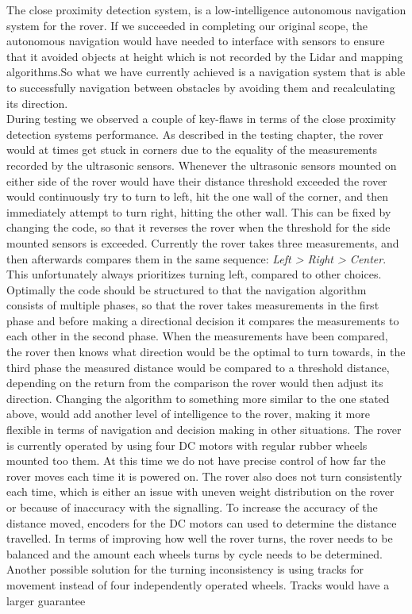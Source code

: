 The close proximity detection system, is a low-intelligence autonomous navigation system for the rover. If we succeeded in completing our original scope, the autonomous navigation would have needed to interface with sensors to ensure that it avoided objects at height which is not recorded by the Lidar and mapping algorithms.So what we have currently achieved is a navigation system that is able to successfully navigation between obstacles by avoiding them and recalculating its direction.\\

During testing we observed a couple of key-flaws in terms of the close proximity detection systems performance.
As described in the testing chapter, the rover would at times get stuck in corners due to the equality of the measurements recorded by the ultrasonic sensors. Whenever the ultrasonic sensors mounted on either side of the rover would have their distance threshold exceeded the rover would continuously try to turn to left, hit the one wall of the corner, and then immediately attempt to turn right, hitting the other wall. This can be fixed by changing the code, so that it reverses the rover when the threshold for the side mounted sensors is exceeded. Currently the rover takes three measurements, and then afterwards compares them in the same sequence: \textit{Left > Right > Center}. This unfortunately always prioritizes turning left, compared to other choices. Optimally the code should be structured to that the navigation algorithm consists of multiple phases, so that the rover takes measurements in the first phase and before making a directional decision it compares the measurements to each other in the second phase. When the measurements have been compared, the rover then knows what direction would be the optimal to turn towards, in the third phase the measured distance would be compared to a threshold distance, depending on the return from the comparison the rover would then adjust its direction.
Changing the algorithm to something more similar to the one stated above, would add another level of intelligence to the rover, making it more flexible in terms of navigation and decision making in other situations.
The rover is currently operated by using four DC motors with regular rubber wheels mounted too them. At this time we do not have precise control of how far the rover moves each time it is powered on. The rover also does not turn consistently each time, which is either an issue with uneven weight distribution on the rover or because of inaccuracy with the signalling.
To increase the accuracy of the distance moved, encoders for the DC motors can used to determine the distance travelled. In terms of improving how well the rover turns, the rover needs to be balanced and the amount each wheels turns by cycle needs to be determined. Another possible solution for the turning inconsistency is using tracks for movement instead of four independently operated wheels. Tracks would have a larger guarantee

